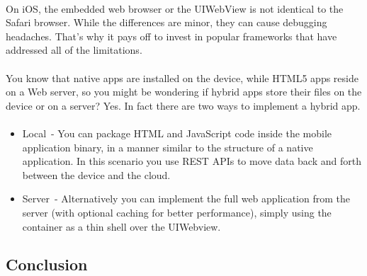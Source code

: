 \paragraph{}

On iOS, the embedded web browser or the UIWebView is not identical to the Safari browser. While the differences are minor, they can cause debugging headaches. That’s why it pays off to invest in popular frameworks that have addressed all of the limitations.

\paragraph{}
You know that native apps are installed on the device, while HTML5 apps reside on a Web server, so you might be wondering if hybrid apps store their files on the device or on a server? Yes. In fact there are two ways to implement a hybrid app.


\paragraph{}

\begin{itemize}
\item Local - You can package HTML and JavaScript code inside the mobile application binary, in a manner similar to the structure of a native application. In this scenario you use REST APIs to move data back and forth between the device and the cloud.
\item Server - Alternatively you can implement the full web application from the server (with optional caching for better performance), simply using the container as a thin shell over the UIWebview.
\end{itemize}


\subsection{Conclusion}


